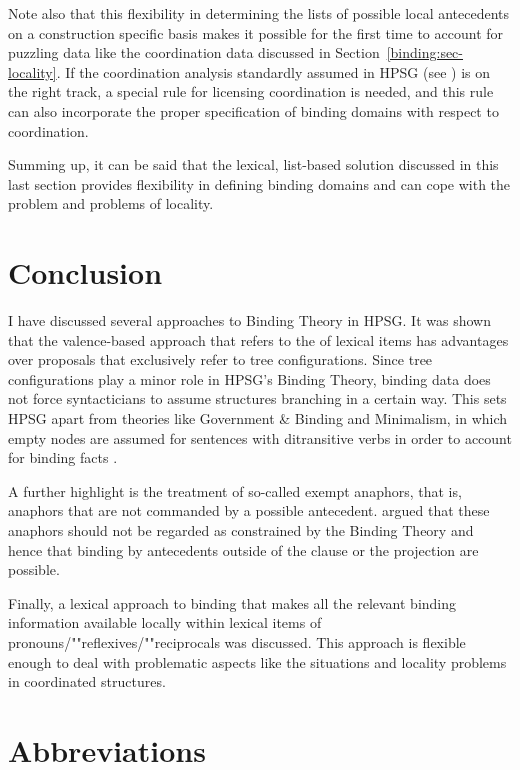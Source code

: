 \documentclass[output=paper,biblatex,babelshorthands,newtxmath,draftmode,colorlinks,citecolor=brown]{langscibook}
\begin{document}
Note also that this flexibility in determining the lists of possible local antecedents on a
construction specific basis makes it possible for the first time to account for puzzling data like
the coordination data discussed in Section~\ref{binding:sec-locality}. If the coordination analysis
standardly assumed in HPSG (see ) is on the right track, a special
rule for licensing coordination is needed, and this rule can also incorporate the proper
specification of binding domains with respect to coordination.


Summing up, it can be said that the lexical, list-based solution discussed in this last section
provides flexibility in defining binding domains and can cope with the \iwithini problem and
problems of locality. 


\section{Conclusion}

I have discussed several approaches to Binding Theory in HPSG. It was shown that the
valence-based approach that refers to the \argstl of lexical items has advantages over proposals
that exclusively refer to tree configurations. Since tree configurations play a minor role in HPSG's
Binding Theory, binding data does not force syntacticians to assume structures branching in a
certain way. This sets HPSG apart from theories like Government \& Binding and Minimalism, in which
empty nodes are assumed for sentences with ditransitive verbs in order to account for binding facts
\crossrefchapterp[\pageref{minimalism:page-binding-branching-start}--\pageref{minimalism:page-binding-branching-end}]{minimalism}. 

A further highlight is the treatment of so-called exempt anaphors, that is, anaphors that are not
commanded by a possible antecedent. \citet{PS92a}
argued that these anaphors should not be regarded
as constrained by the Binding Theory and hence that binding by antecedents outside of the clause or
the projection are possible.

Finally, a lexical approach to binding that makes all the relevant binding information
available locally within lexical items of pronouns/""reflexives/""reciprocals was discussed. This approach is flexible enough to deal with
problematic aspects like the \iwithini situations and locality problems in coordinated structures.

\section*{Abbreviations}
\end{document}
